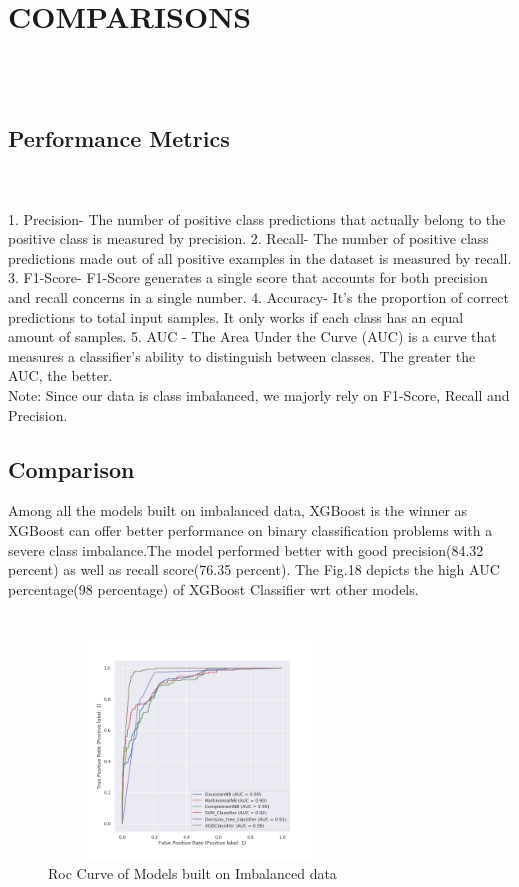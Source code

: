 \documentclass[a4paper, 10pt, conference]{ieeeconf}      %
\begin{document}
\section{\textbf{COMPARISONS}}
\\\\\subsection{\textbf{Performance Metrics}}
\\\
\\1. Precision- The number of positive class predictions that actually belong to the positive class is measured by precision.
2. Recall- The number of positive class predictions made out of all positive examples in the dataset is measured by recall.
3. F1-Score- F1-Score generates a single score that accounts for both precision and recall concerns in a single number.
4. Accuracy- It's the proportion of correct predictions to total input samples. It only works if each class has an equal amount of samples. 
5. AUC - The Area Under the Curve (AUC) is a  curve that measures a classifier's ability to distinguish between classes. The greater the AUC, the better.
\\Note: Since our data is class imbalanced, we majorly rely on F1-Score, Recall and Precision.
\subsection{\textbf{Comparison}}
Among all the models built on imbalanced data, XGBoost is the winner as XGBoost can offer better performance on binary classification problems with a severe class imbalance.The model performed better with good precision(84.32 percent) as well as recall score(76.35 percent). The Fig.18 depicts the high AUC percentage(98 percentage) of XGBoost Classifier wrt other models. 
\\\
\begin{figure}[htp]
    \centering
    \includegraphics[width=8cm,height=6cm]{Images/Roc_without_sampling_final.png}
    \caption{Roc Curve of Models built on Imbalanced data}
    \label{fig:Roc Curve of Models built on Imbalanced data}
\end{figure}
\\\
\end{document}
